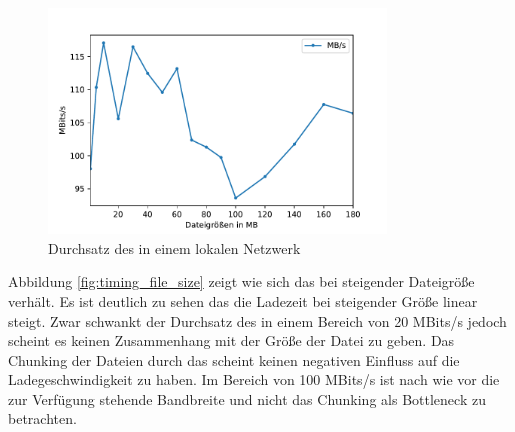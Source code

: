 \begin{figure}[!h]
	\centering
	\includegraphics[width=0.8\textwidth]{figures/durchsatz_file_size}
	\caption[A Figure Short-Title]{Durchsatz des \ptp \cdns in einem lokalen Netzwerk}
	\label{fig:durchsatz_file_size}
\end{figure}

Abbildung \ref{fig:timing_file_size} zeigt wie sich das \cdn bei steigender Dateigröße verhält. Es ist deutlich zu sehen das die Ladezeit bei steigender Größe linear steigt. Zwar schwankt der Durchsatz des \cdns in einem Bereich von 20 MBits/s jedoch scheint es keinen Zusammenhang mit der Größe der Datei zu geben. Das Chunking der Dateien durch das \pTp \cdn scheint keinen negativen Einfluss auf die Ladegeschwindigkeit zu haben. Im Bereich von 100 MBits/s ist nach wie vor die zur Verfügung stehende Bandbreite und nicht das Chunking als Bottleneck zu betrachten.



